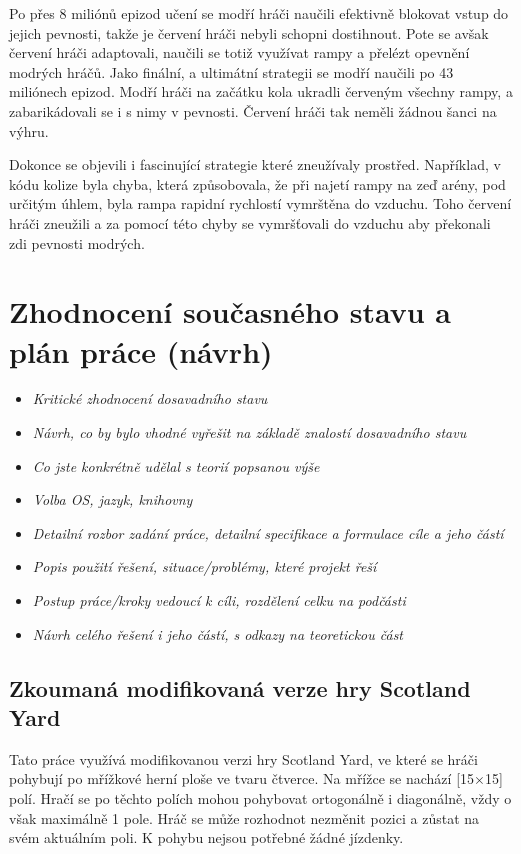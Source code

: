 Po přes 8 miliónů epizod učení se modří hráči naučili efektivně blokovat vstup do jejich pevnosti, takže je červení hráči nebyli schopni dostihnout.
Pote se avšak červení hráči adaptovali, naučili se totiž využívat rampy a přelézt opevnění modrých hráčů.
Jako finální, a ultimátní strategii se modří naučili po 43 miliónech epizod.
Modří hráči na začátku kola ukradli červeným všechny rampy, a zabarikádovali se i s nimy v pevnosti.
Červení hráči tak neměli žádnou šanci na výhru.

Dokonce se objevili i fascinující strategie které zneužívaly prostřed.
Například, v kódu kolize byla chyba, která způsobovala, že při najetí rampy na zeď arény, pod určitým úhlem, byla rampa rapidní rychlostí vymrštěna do vzduchu.
Toho červení hráči zneužili a za pomocí této chyby se vymršťovali do vzduchu aby překonali zdi pevnosti modrých.

\chapter{Zhodnocení současného stavu a plán práce (návrh)}
\label{ch:navrh}
\begin{itemize}
  \item \emph {Kritické zhodnocení dosavadního stavu}
  \item \emph {Návrh, co by bylo vhodné vyřešit na základě znalostí dosavadního stavu}
  \item \emph {Co jste konkrétně udělal s teorií popsanou výše}
  \item \emph {Volba OS, jazyk, knihovny}
  \item \emph {Detailní rozbor zadání práce, detailní specifikace a formulace cíle a jeho částí}
  \item \emph {Popis použití řešení, situace/problémy, které projekt řeší}
  \item \emph {Postup práce/kroky vedoucí k cíli, rozdělení celku na podčásti}
  \item \emph {Návrh celého řešení i jeho částí, s odkazy na teoretickou část}
\end{itemize}

\section{Zkoumaná modifikovaná verze hry Scotland Yard}\label{sec:zkoumana-modifikovana-verze-hry-scotland-yard}

Tato práce využívá modifikovanou verzi hry Scotland Yard, ve které se hráči pohybují po mřížkové herní ploše ve tvaru čtverce.
Na mřížce se nachází {\color{red}[15$\times$15]} polí.
Hračí se po těchto polích mohou pohybovat ortogonálně i diagonálně, vždy o však maximálně 1 pole.
Hráč se může rozhodnot nezměnit pozici a zůstat na svém aktuálním poli.
K pohybu nejsou potřebné žádné jízdenky.

